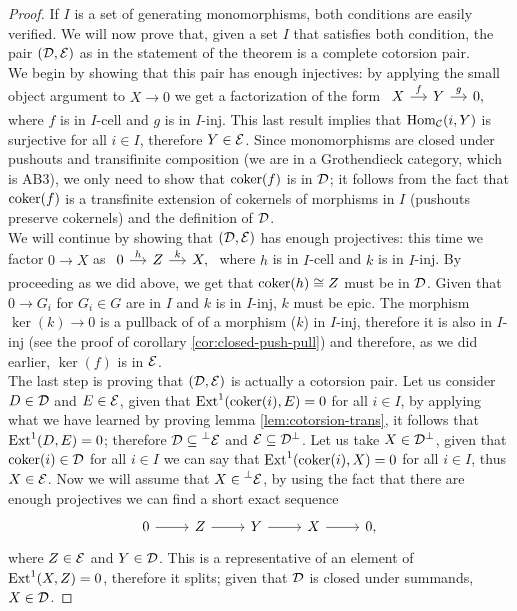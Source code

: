 \begin{proof}
	If $I$ is a set of generating monomorphisms, both conditions are easily verified. We will now prove that, given a set $I$ that satisfies both condition, the pair $(\mathcal{D}, \mathcal{E})$ as in the statement of the theorem is a complete cotorsion pair.\\
	We begin by showing that this pair has enough injectives: by applying the small object argument to $X \longrightarrow 0$ we get a factorization of the form
	$\begin{tikzcd}[sep=small]
		X & Y & {0,}
		\arrow["f", from=1-1, to=1-2]
		\arrow["g", from=1-2, to=1-3]
	\end{tikzcd}$
	where $f$ is in $I$-cell and $g$ is in $I$-inj. This last result implies that $\mathrm{Hom}_{\mathcal{C}}(i,Y)$ is surjective for all $i \in I$, therefore $Y \in \mathcal{E}$. Since monomorphisms are closed under pushouts and transifinite composition (we are in a Grothendieck category, which is AB3), we only need to show that $\operatorname{coker}(f)$ is in $\mathcal{D}$; it follows from the fact that $\operatorname{coker}(f)$ is a transfinite extension of cokernels of morphisms in $I$ (pushouts preserve cokernels) and the definition of $\mathcal{D}$. \\
	We will continue by showing that $(\mathcal{D}, \mathcal{E})$ has enough projectives: this time we factor $0\longrightarrow X$ as 
	$\begin{tikzcd}[sep=small]
		0 & Z & {X,}
		\arrow["h", from=1-1, to=1-2]
		\arrow["k", from=1-2, to=1-3]
	\end{tikzcd}$
	where $h$ is in $I$-cell and $k$ is in $I$-inj. By proceeding as we did above, we get that $\operatorname{coker}(h) \cong Z$ must be in $\mathcal{D}$. Given that $0\longrightarrow G_i$ for $G_i \in G$ are in $I$ and $k$ is in $I$-inj, $k$ must be epic. The morphism $\ker(k) \longrightarrow 0$ is a pullback of of a morphism ($k$) in $I$-inj, therefore it is also in $I$-inj (see the proof of corollary \ref{cor:closed-push-pull}) and therefore, as we did earlier, $\ker(f)$ is in $\mathcal{E}$. \\
	The last step is proving that $(\mathcal{D}, \mathcal{E})$ is actually a cotorsion pair. Let us consider $D \in \mathcal{D}$ and $E \in \mathcal{E}$, given that $\mathrm{Ext}^1(\operatorname{coker}(i), E) = 0$ for all $i \in I$, by applying what we have learned by proving lemma \ref{lem:cotorsion-trans}, it follows that $\mathrm{Ext}^1(D, E) = 0$; therefore $\mathcal{D} \subseteq \prescript{\perp}{}{\mathcal{E}}$ and $\mathcal{E} \subseteq {\mathcal{D}}^\perp$. Let us take $X\in {\mathcal{D}}^\perp$, given that $\operatorname{coker}(i) \in \mathcal{D} $ for all $i \in I$ we can say that $\mathrm{Ext}^1(\operatorname{coker}(i), X) = 0$ for all $i \in I$, thus $X \in \mathcal{E}$. Now we will assume that $X \in \prescript{\perp}{}{\mathcal{E}}$, by using the fact that there are enough projectives we can find a short exact sequence
	\[\begin{tikzcd}
		0 & Z & Y & X & {0,}
		\arrow[from=1-1, to=1-2]
		\arrow[from=1-2, to=1-3]
		\arrow[from=1-3, to=1-4]
		\arrow[from=1-4, to=1-5]
	\end{tikzcd}\]
	where $Z \in \mathcal{E}$ and $Y \in \mathcal{D}$. This is a representative of an element of $\mathrm{Ext}^1(X, Z) = 0$, therefore it splits; given that $\mathcal{D}$ is closed under summands, $X \in \mathcal{D}$.
\end{proof}

